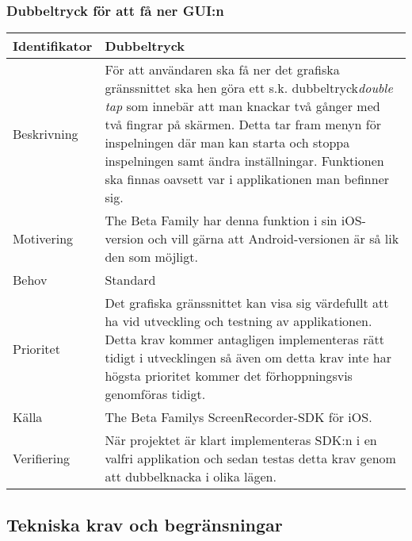 \subsubsection{Dubbeltryck för att få ner GUI:n}
\begin{tabular}{ | p{65pt} | p{300pt} |}
  \hline
  Identifikator &
  Dubbeltryck
  \\ \hline
  Beskrivning & 
  För att användaren ska få ner det grafiska gränssnittet ska hen göra ett s.k. dubbeltryck\emph{double tap} som innebär att man knackar två gånger med två fingrar på skärmen. Detta tar fram menyn för inspelningen där man kan starta och stoppa inspelningen samt ändra inställningar. Funktionen ska finnas oavsett var i applikationen man befinner sig.
  \\ \hline
  Motivering &
  The Beta Family har denna funktion i sin iOS-version och vill gärna att Android-versionen är så lik den som möjligt.
  \\ \hline
  Behov &
  Standard
  \\ \hline
  Prioritet &
  Det grafiska gränssnittet kan visa sig värdefullt att ha vid utveckling och testning av applikationen. Detta krav kommer antagligen implementeras rätt tidigt i utvecklingen så även om detta krav inte har högsta prioritet kommer det förhoppningsvis genomföras tidigt.
  \\ \hline
  Källa &
  The Beta Familys ScreenRecorder-SDK för iOS.
  \\ \hline
  Verifiering &
När projektet är klart implementeras SDK:n i en valfri applikation och sedan testas detta krav genom att dubbelknacka i olika lägen.
  \\ \hline
  \end{tabular}

\subsection{Tekniska krav och begränsningar}
\label{subsec:techreq}


